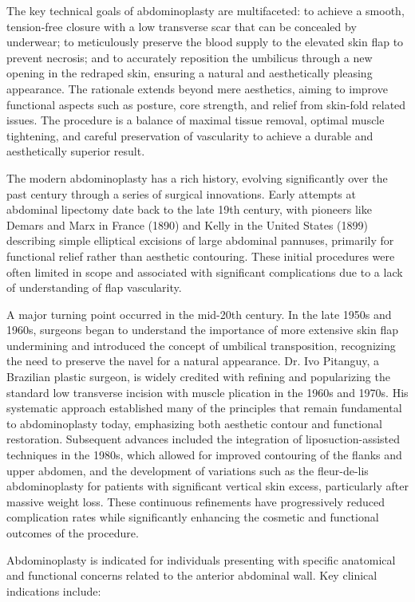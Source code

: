 The key technical goals of abdominoplasty are multifaceted: to achieve a smooth, tension-free closure with a low transverse scar that can be concealed by underwear; to meticulously preserve the blood supply to the elevated skin flap to prevent necrosis; and to accurately reposition the umbilicus through a new opening in the redraped skin, ensuring a natural and aesthetically pleasing appearance. The rationale extends beyond mere aesthetics, aiming to improve functional aspects such as posture, core strength, and relief from skin-fold related issues. The procedure is a balance of maximal tissue removal, optimal muscle tightening, and careful preservation of vascularity to achieve a durable and aesthetically superior result.

The modern abdominoplasty has a rich history, evolving significantly over the past century through a series of surgical innovations. Early attempts at abdominal lipectomy date back to the late 19th century, with pioneers like Demars and Marx in France (1890) and Kelly in the United States (1899) describing simple elliptical excisions of large abdominal pannuses, primarily for functional relief rather than aesthetic contouring. These initial procedures were often limited in scope and associated with significant complications due to a lack of understanding of flap vascularity.

A major turning point occurred in the mid-20th century. In the late 1950s and 1960s, surgeons began to understand the importance of more extensive skin flap undermining and introduced the concept of umbilical transposition, recognizing the need to preserve the navel for a natural appearance. Dr. Ivo Pitanguy, a Brazilian plastic surgeon, is widely credited with refining and popularizing the standard low transverse incision with muscle plication in the 1960s and 1970s. His systematic approach established many of the principles that remain fundamental to abdominoplasty today, emphasizing both aesthetic contour and functional restoration. Subsequent advances included the integration of liposuction-assisted techniques in the 1980s, which allowed for improved contouring of the flanks and upper abdomen, and the development of variations such as the fleur-de-lis abdominoplasty for patients with significant vertical skin excess, particularly after massive weight loss. These continuous refinements have progressively reduced complication rates while significantly enhancing the cosmetic and functional outcomes of the procedure.

Abdominoplasty is indicated for individuals presenting with specific anatomical and functional concerns related to the anterior abdominal wall. Key clinical indications include:

